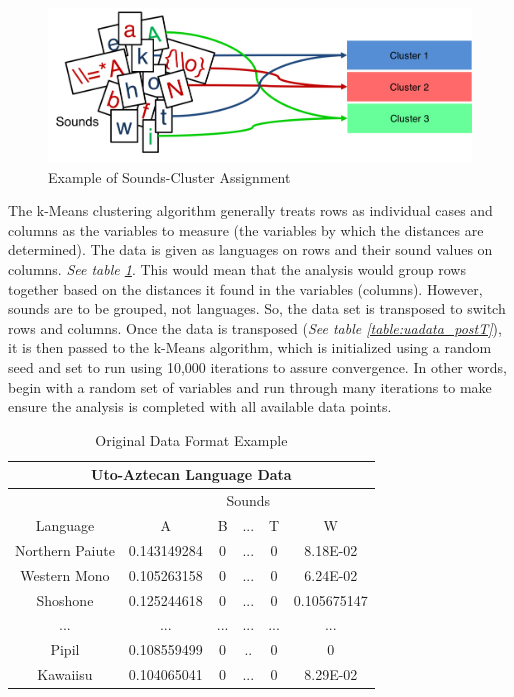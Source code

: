 \documentclass{article}
\begin{document}
\begin{figure}[h!]
\centering
\includegraphics[width=\textwidth]{soundclusters.png}
\caption{Example of Sounds-Cluster Assignment}
\label{fig:soundclusters}
\end{figure}


The k-Means clustering algorithm generally treats rows as individual cases and columns as the variables to measure (the variables by which the distances are determined). The data is given as languages on rows and their sound values on columns. \textit{See table \ref{table:uadata_preT}}. This would mean that the analysis would group rows together based on the distances it found in the variables (columns). However, sounds are to be grouped, not languages. So, the data set is transposed to switch rows and columns. Once the data is transposed (\textit{See table \ref{table:uadata_postT}}), it is then passed to the k-Means algorithm, which is initialized using a random seed and set to run using 10,000 iterations to assure convergence. In other words, begin with a random set of variables and run through many iterations to make ensure the analysis is completed with all available data points.\cite{saseguide}


\begin{table}
\centering
\begin{tabular}{|c| c c c c c|}
 \hline
 \multicolumn{6}{|c|}{\textbf{Uto-Aztecan Language Data}} \\
 \hline
 &\multicolumn{5}{|c|}{Sounds} \\
 \hline
 Language&A&B&...&T&W\\
 \hline
 Northern Paiute&0.143149284&0&...&0&8.18E-02\\
 Western Mono&0.105263158&0&...&0&6.24E-02\\
 Shoshone&0.125244618&0&...&0&0.105675147\\
 ...&...&...&...&...&...\\
 Pipil&0.108559499&0&..&0&0\\
 Kawaiisu&0.104065041&0&...&0&8.29E-02\\
 \hline
\end{tabular}
\caption{Original Data Format Example}
\label{table:uadata_preT}
\end{table}
\end{document}

